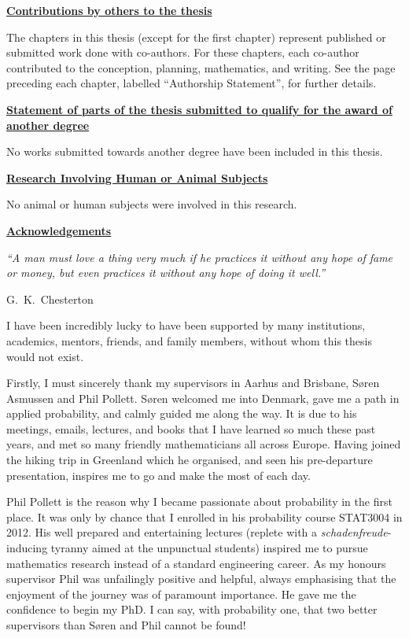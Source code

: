 {\bf \underline{Contributions by others to the thesis}}

The chapters in this thesis (except for the first chapter) represent published or submitted work done with co-authors. For these chapters, each co-author contributed to the conception, planning, mathematics, and writing. See the page preceding each chapter, labelled ``Authorship Statement'', for further details.

\newpage
{\bf \underline{Statement of parts of the thesis submitted to qualify for
the award of} \\
\underline{another degree}}

No works submitted towards another degree have been included in this thesis.

{\bf \underline{Research Involving Human or Animal Subjects}}

No animal or human subjects were involved in this research.

\newpage

{\bf \underline{Acknowledgements}}

\vspace{-1em}
\begin{center}
\emph{``A man must love a thing very much if he practices it without any hope of fame or money, but even practices it without any hope of doing it well.''}
\end{center}
\vspace{-1.6em}
\hfill G.\ K.\ Chesterton~~~~~~~~

I have been incredibly lucky to have been supported by many institutions, academics, mentors, friends, and family members, without whom this thesis would not exist.

Firstly, I must sincerely thank my supervisors in Aarhus and Brisbane, S{\o}ren Asmussen and Phil Pollett. S{\o}ren welcomed me into Denmark, gave me a path in applied probability, and calmly guided me along the way. It is due to his meetings, emails, lectures, and books that I have learned so much these past years, and met so many friendly mathematicians all across Europe. Having joined the hiking trip in Greenland which he organised, and seen his pre-departure presentation, inspires me to go and make the most of each day.

Phil Pollett is the reason why I became passionate about probability in the first place. It was only by chance that I enrolled in his probability course STAT3004 in 2012. His well prepared and entertaining lectures (replete with a \emph{schadenfreude}-inducing tyranny aimed at the unpunctual students) inspired me to pursue mathematics research instead of a standard engineering career. As my honours supervisor Phil was unfailingly positive and helpful, always emphasising that the enjoyment of the journey was of paramount importance. He gave me the confidence to begin my PhD. I can say, with probability one, that two better supervisors than S{\o}ren and Phil cannot be found!

